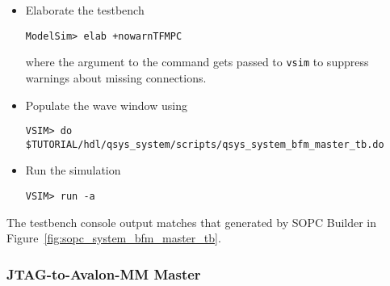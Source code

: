 \documentclass[10pt,twoside]{article}
\begin{document}
\begin{itemize}
\begin{verbatim}
\end{verbatim}
%
\item Elaborate the testbench
%
\begin{verbatim}
ModelSim> elab +nowarnTFMPC
\end{verbatim}
%
where the argument to the command gets passed to \verb+vsim+ to
suppress warnings about missing connections.
%
\item Populate the wave window using
%
\begin{verbatim}
VSIM> do $TUTORIAL/hdl/qsys_system/scripts/qsys_system_bfm_master_tb.do
\end{verbatim}
%
\item Run the simulation
%
\begin{verbatim}
VSIM> run -a
\end{verbatim}
%
\end{itemize}
%
The testbench console output matches that generated by 
SOPC Builder in Figure~\ref{fig:sopc_system_bfm_master_tb}.

\clearpage
\subsubsection{JTAG-to-Avalon-MM Master}
\end{document}
